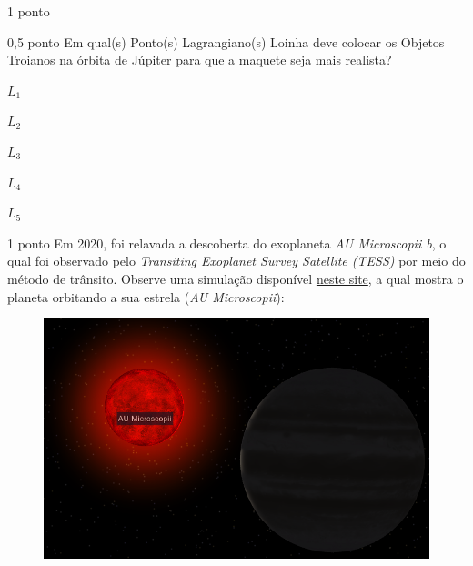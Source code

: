 \documentclass{../lista}
\begin{document}
\begin{questao}{1 ponto}
		\begin{pergunta}{0,5 ponto}
			Em qual(s) Ponto(s) Lagrangiano(s) Loinha deve colocar os Objetos Troianos na órbita de Júpiter para que a maquete seja mais realista?
			\begin{alternativas}
				\item $L_1$
				\item $L_2$
				\item $L_3$
				\item $L_4$
				\item $L_5$
			\end{alternativas}
		\end{pergunta}
	\end{questao}

	\begin{questao}{1 ponto}
		Em 2020, foi relavada a descoberta do exoplaneta \textit{AU Microscopii b}, o qual foi observado pelo \textit{Transiting Exoplanet Survey Satellite (TESS)} por meio do método de trânsito. Observe uma simulação disponível \href{https://exoplanets.nasa.gov/exoplanet-catalog/7635/au-microscopii-b/}{neste site}, a qual mostra o planeta orbitando a sua estrela (\textit{AU Microscopii}):
		\begin{figure}[H]
			\centering
			\includegraphics[scale=0.5]{./img/4.png}
		\end{figure}


\end{questao}
\end{document}
